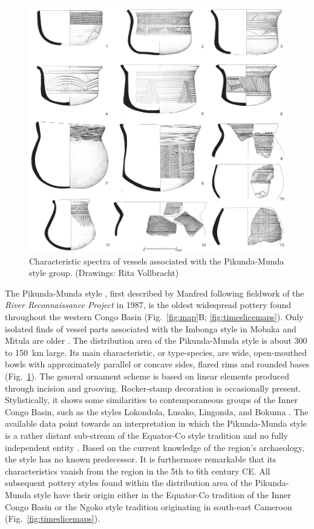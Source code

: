 \documentclass[smallextended,natbib]{svjour3}       %
\begin{document}
\begin{figure}[!tb]
	\includegraphics[width=\textwidth]{Fig_PKMvessels.pdf}
	\caption{Characteristic spectra of vessels associated with the Pikunda-Munda style group. (Drawings: Rita Vollbracht)}
	\label{fig:pkmtypes}
\end{figure}

The Pikunda-Munda style \cite[114--120]{Seidensticker.2021e}, first described by Manfred \citet{Eggert.1992,Eggert.1993} following fieldwork of the \textit{River Reconnaissance Project} in 1987, is the oldest widespread pottery found throughout the western Congo Basin (Fig.~\ref{fig:map}B; \ref{fig:timeslicemaps}). Only isolated finds of vessel parts associated with the Imbonga style in Mobaka and Mitula are older \cite[169--172]{Seidensticker.2021e}. The distribution area of the Pikunda-Munda style is about 300 to 150~km large. Its main characteristic, or type-species, are wide, open-mouthed bowls with approximately parallel or concave sides, flared rims and rounded bases (Fig.~\ref{fig:pkmtypes}). The general ornament scheme is based on linear elements produced through incision and grooving. Rocker-stamp decoration is occasionally present. Stylistically, it shows some similarities to contemporaneous groups of the Inner Congo Basin, such as the styles Lokondola, Lusako, Lingonda, and Bokuma \citep[107]{Wotzka.1995}. The available data point towards an interpretation in which the Pikunda-Munda style is a rather distant sub-stream of the Equator-Co style tradition and no fully independent entity \citep[192]{Seidensticker.2021e}. Based on the current knowledge of the region's archaeology, the style has no known predecessor. It is furthermore remarkable that its characteristics vanish from the region in the 5th to 6th century CE. All subsequent pottery styles found within the distribution area of the Pikunda-Munda style have their origin either in the Equator-Co tradition of the Inner Congo Basin \citep[222-224 Fig.~4,273]{Wotzka.1995} or the Ngoko style tradition originating in south-east Cameroon \citep[189--192]{Seidensticker.2021e} (Fig.~\ref{fig:timeslicemaps}).
\end{document}
